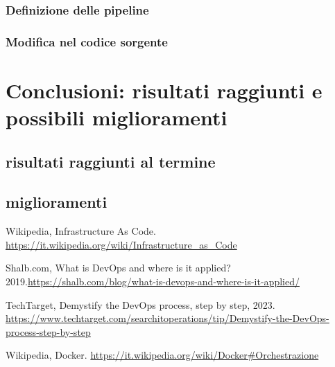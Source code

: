 \documentclass[a4paper,12pt]{report}
\begin{document}
\subsection{Definizione delle pipeline}
\subsection{Modifica nel codice sorgente}

\chapter{Conclusioni: risultati raggiunti e possibili miglioramenti}
\section{risultati raggiunti al termine}
\section{miglioramenti}

%
%
\begin{thebibliography}{00}
%
Wikipedia, Infrastructure As Code. \url{https://it.wikipedia.org/wiki/Infrastructure_as_Code}

Shalb.com, What is DevOps and where is it applied? 2019.\url{https://shalb.com/blog/what-is-devops-and-where-is-it-applied/}

TechTarget, Demystify the DevOps process, step by step, 2023. \url{https://www.techtarget.com/searchitoperations/tip/Demystify-the-DevOps-process-step-by-step}

Wikipedia, Docker. \url{https://it.wikipedia.org/wiki/Docker#Orchestrazione}
%
%
\end{thebibliography}
% 
\end{document}
